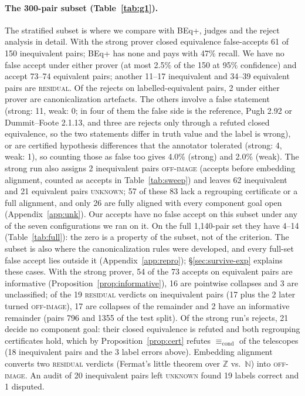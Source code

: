 \documentclass[10pt]{article}
\theoremstyle{definition}
\newcommand{\Econd}{\mathrel{\equiv_{\mathrm{cond}}}}
\newcommand{\V}[1]{\textsc{#1}}
\begin{document}
\paragraph{The 300-pair subset (Table~\ref{tab:g1}).} The stratified subset is where we compare
with BEq+, judges and the reject analysis in detail. With the strong prover closed equivalence
false-accepts 61 of 150 inequivalent pairs; BEq+ has none and pays with 47\% recall. We have
no false accept under either prover (at most 2.5\% of the 150 at 95\% confidence) and accept
73--74 equivalent pairs; another 11--17
inequivalent and 34--39 equivalent pairs are \V{residual}. Of the rejects on labelled-equivalent
pairs, 2 under either prover are canonicalization artefacts. The others involve a false statement
(strong: 11, weak: 0; in four of them the false side is the reference, Pugh 2.92 or Dummit--Foote
2.1.13, and three are rejects only through a refuted closed equivalence, so the two statements
differ in truth value and the label is wrong), or are certified hypothesis differences that the
annotator tolerated (strong: 4, weak: 1), so counting those as false too gives 4.0\% (strong) and
2.0\% (weak). The strong run also assigns 2 inequivalent pairs \V{off-image} (accepts before
embedding alignment, counted as accepts in Table~\ref{tab:sweep}) and leaves 62 inequivalent and
21 equivalent pairs \V{unknown}; 57 of these 83 lack a regrouping certificate or a full
alignment, and only 26 are fully aligned with every component goal open
(Appendix~\ref{app:unk}). Our accepts have no false accept on this subset under any of the
seven configurations we ran on it. On the full 1,140-pair set they have 4--14
(Table~\ref{tab:full}): the zero is a property of the subset, not of the criterion. The subset is
also where the canonicalization rules were developed, and every full-set false accept lies outside
it (Appendix~\ref{app:repro}); \S\ref{sec:survive-exp} explains these cases. With the strong prover, 54 of the 73
accepts on equivalent pairs are informative (Proposition~\ref{prop:informative}), 16 are
pointwise collapses and 3 are unclassified; of the 19 \V{residual} verdicts on inequivalent
pairs (17 plus the 2 later turned \V{off-image}), 17 are collapses of the remainder and 2 have an informative remainder (pairs 796 and
1355 of the test split). Of the strong run's rejects, 21 decide no component goal: their
closed equivalence is refuted and both regrouping certificates hold, which by
Proposition~\ref{prop:cert} refutes $\Econd$ of the telescopes (18 inequivalent pairs and the 3
label errors above). Embedding alignment converts two \V{residual} verdicts
(Fermat's little theorem over $\mathbb Z$ vs.\ $\mathbb N$) into \V{off-image}. An audit of 20
inequivalent pairs left \V{unknown} found 19 labels correct and 1 disputed.
\end{document}
